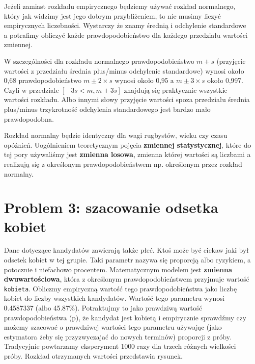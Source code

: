 \documentclass[
  openany]{book}
\begin{document}
Jeżeli zamiast rozkładu empirycznego będziemy używać rozkład normalnego, który jak widzimy
jest jego dobrym przybliżeniem, to nie musimy liczyć empirycznych liczebności. Wystarczy że
znamy średnią i odchylenie standardowe a potrafimy obliczyć każde prawdopodobieństwo dla
każdego przedziału wartości zmiennej.

W szczególności dla rozkładu normalnego prawdopodobieństwo \(m \pm s\) (przyjęcie wartości z przedziału
średnia plus/minus odchylenie standardowe) wynosi około 0,68
prawdopodobieństwo \(m \pm 2 \times s\) wynosi około 0,95 a \(m \pm 3 \times s\) około 0,997.
Czyli w przedziale \([-3s < m, m +3s]\) znajdują się praktycznie wszystkie wartości
rozkładu. Albo innymi słowy przyjęcie wartości spoza przedziału średnia plus/minus trzykrotność
odchylenia standardowego jest bardzo mało prawdopodobna.

Rozkład normalny będzie identyczny dla wagi rugbystów, wieku czy czasu opóźnień.
Uogólnieniem teoretycznym pojęcia \textbf{zmiennej statystycznej}, które do tej pory
używaliśmy jest \textbf{zmienna losowa}, zmienna której wartości są liczbami a realizują się
z określonym prawdopodobieństwem np. określonym przez rozkład normalny.

\hypertarget{problem-3-szacowanie-odsetka-kobiet}{%
\section{Problem 3: szacowanie odsetka kobiet}\label{problem-3-szacowanie-odsetka-kobiet}}

Dane dotyczące kandydatów zawierają także płeć. Ktoś może być ciekaw
jaki był odsetek kobiet w tej grupie. Taki parametr nazywa się proporcją
albo ryzykiem, a potocznie i niefachowo procentem.
Matematycznym modelem jest \textbf{zmienna dwuwartościowa}, która
z określonym prawdopodobieństwem przyjmuje wartość \texttt{kobieta}.
Obliczmy
empiryczną wartość tego prawdopodobieństwa jako liczbę kobiet do liczby
wszystkich kandydatów. Wartość tego parametru wynosi 0.4587337 (albo
45.87\%).
Potraktujmy to jako prawdziwą wartość prawdopodobieństwa (p), że
kandydat jest kobietą i empirycznie sprawdźmy czy możemy szacować
o prawdziwej wartości tego parametru
używając (jako estymatora żeby się przyzwyczajać do nowych terminów) proporcji z próby.
Tradycyjnie powtarzamy eksperyment 1000 razy
dla trzech różnych wielkości próby. Rozkład otrzymanych wartości przedstawia rysunek.
\end{document}
